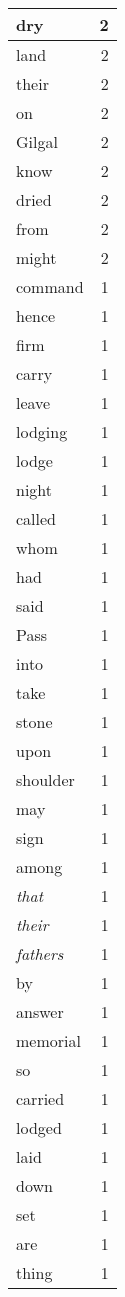 \begin{center}
\begin{longtable}{l|r}
dry & 2\\ \hline 
land & 2\\ \hline 
their & 2\\ \hline 
on & 2\\ \hline 
Gilgal & 2\\ \hline 
know & 2\\ \hline 
dried & 2\\ \hline 
from & 2\\ \hline 
might & 2\\ \hline 
command & 1\\ \hline 
hence & 1\\ \hline 
firm & 1\\ \hline 
carry & 1\\ \hline 
leave & 1\\ \hline 
lodging & 1\\ \hline 
lodge & 1\\ \hline 
night & 1\\ \hline 
called & 1\\ \hline 
whom & 1\\ \hline 
had & 1\\ \hline 
said & 1\\ \hline 
Pass & 1\\ \hline 
into & 1\\ \hline 
take & 1\\ \hline 
stone & 1\\ \hline 
upon & 1\\ \hline 
shoulder & 1\\ \hline 
may & 1\\ \hline 
sign & 1\\ \hline 
among & 1\\ \hline 
\emph{that} & 1\\ \hline 
\emph{their} & 1\\ \hline 
\emph{fathers} & 1\\ \hline 
by & 1\\ \hline 
answer & 1\\ \hline 
memorial & 1\\ \hline 
so & 1\\ \hline 
carried & 1\\ \hline 
lodged & 1\\ \hline 
laid & 1\\ \hline 
down & 1\\ \hline 
set & 1\\ \hline 
are & 1\\ \hline 
thing & 1\\ \hline 

\end{longtable}
\end{center}
